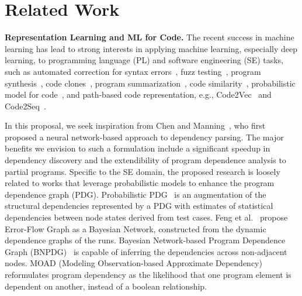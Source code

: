 \section{Related Work}
\textbf{Representation Learning and ML for Code.}  The recent success in
machine learning has lead to strong interests in applying machine
learning, especially deep learning, to programming language (PL) and
software engineering (SE) tasks, such as automated correction for
syntax errors~\cite{Bhatia-2016}, fuzz testing~\cite{Patra-2016},
program synthesis~\cite{Amodio-2017}, code
clones~\cite{White-2016,Smith-2009,Li-2017}, program
summarization~\cite{Allamanis-2016,Mou-2014}, code
similarity~\cite{Zhao-2018,Alon-2018}, probabilistic model for
code~\cite{Bielik-2016}, and path-based code representation,
e.g., Code2Vec~\cite{Alon-2018} and Code2Seq~\cite{alon2018code2seq}. 

In this proposal, we seek inspiration from Chen and Manning~\cite{chen-manning-2014-fast}, who first proposed a neural network-based approach to dependency parsing. The major benefits we envision to such a formulation include a significant speedup in dependency discovery and the extendibility of program dependence analysis to partial programs. 
Specific to the SE domain, 
the proposed research is loosely related to works that leverage probabilistic models to enhance the program dependence graph (PDG). Probabilistic PDG~\cite{baah-issta08-probabilistic} is an augmentation of the structural dependencies represented by a PDG with estimates of statistical dependencies between node states derived from test cases. Feng et al.~\cite{feng-paste10} propose Error-Flow Graph as a Bayesian Network, constructed from the dynamic dependence graphs of the runs. Bayesian Network-based Program Dependence Graph (BNPDG)~\cite{yu-jss17-bayesian} is capable of inferring the dependencies across non-adjacent nodes. MOAD (Modeling Observation-based Approximate Dependency)~\cite{lee-scam19-moad} reformulates program dependency as the likelihood that one program element is dependent on another, instead of a boolean relationship.



